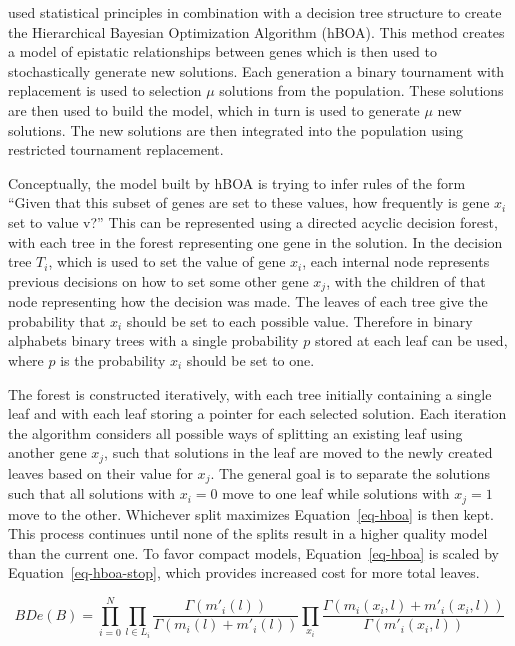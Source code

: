 \documentclass[twoside]{article}
\begin{document}
\cite{pelikan:2006:hboa} used statistical principles in combination with a decision tree structure
to create the Hierarchical Bayesian Optimization Algorithm (hBOA). This method creates a model of
epistatic relationships between genes which is then used to stochastically generate new solutions.
Each generation a binary tournament with replacement is used to selection $\mu$ solutions from
the population. These solutions are then used to build the model, which in turn is used to generate $\mu$ new
solutions. The new solutions are then integrated into the population using restricted tournament
replacement.

Conceptually, the model built by hBOA is trying to infer rules of the form ``Given that this
subset of genes are set to these values, how frequently is gene $x_i$ set to value v?'' This can
be represented using a directed acyclic decision forest, with each tree in the forest representing one gene
in the solution. In the decision tree $T_i$, which is used to set the value of gene $x_i$,
each internal node represents previous decisions on how to set
some other gene $x_j$, with the children of that node representing how the decision was made. The
leaves of each tree give the probability that $x_i$ should be set to each possible value.
Therefore in binary alphabets binary trees with a single probability $p$ stored at each leaf
can be used, where $p$ is the probability $x_i$ should be set to one.

The forest is constructed iteratively, with each tree initially containing a single leaf
and with each leaf storing a pointer for each selected solution. Each iteration the algorithm considers
all possible ways of splitting an existing leaf using another gene $x_j$, such that solutions in the
leaf are moved to the newly created leaves based on their value for $x_j$. The general goal is to
separate the solutions such that all solutions with $x_i = 0$ move to one leaf while solutions with
$x_j = 1$ move to the other. Whichever split maximizes Equation~\ref{eq-hboa} is then kept.
This process continues until none of the splits result in a higher quality model than the current one. To favor compact
models, Equation~\ref{eq-hboa} is scaled by Equation~\ref{eq-hboa-stop}, which provides increased cost
for more total leaves.

\begin{equation}
  BDe(B) = \prod_{i=0}^{N}\prod_{l\in L_i} \frac{\Gamma(m'_i(l))}{\Gamma(m_i(l) + m'_i(l))}
  \prod_{x_i}\frac{\Gamma(m_i(x_i, l) + m'_i(x_i,l))}{\Gamma(m'_i(x_i,l))}
  \label{eq-hboa}
\end{equation}
\end{document}

